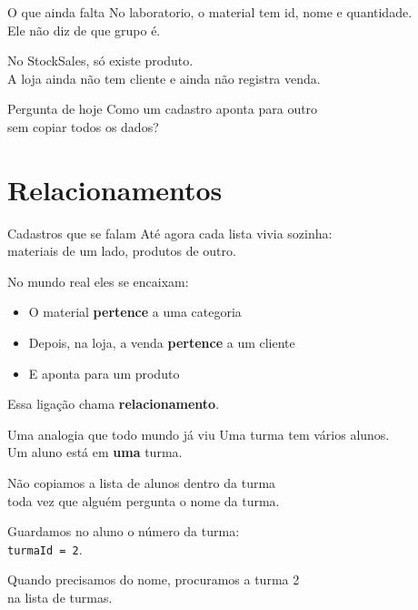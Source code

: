 \documentclass[aspectratio=169,11pt]{beamer}
\begin{document}
\begin{frame}{O que ainda falta}
  No laboratorio, o material tem id, nome e quantidade.\\
  Ele não diz de que grupo é.

  \vspace{0.5em}
  No StockSales, só existe produto.\\
  A loja ainda não tem cliente e ainda não registra venda.

  \vspace{0.6em}
  \begin{block}{Pergunta de hoje}
    Como um cadastro aponta para outro\\
    sem copiar todos os dados?
  \end{block}
\end{frame}

\section{Relacionamentos}

\begin{frame}{Cadastros que se falam}
  Até agora cada lista vivia sozinha:\\
  materiais de um lado, produtos de outro.

  \vspace{0.5em}
  No mundo real eles se encaixam:
  \begin{itemize}
    \item O material \textbf{pertence} a uma categoria
    \item Depois, na loja, a venda \textbf{pertence} a um cliente
    \item E aponta para um produto
  \end{itemize}

  \vspace{0.5em}
  Essa ligação chama \textbf{relacionamento}.
\end{frame}

\begin{frame}{Uma analogia que todo mundo já viu}
  Uma turma tem vários alunos.\\
  Um aluno está em \textbf{uma} turma.

  \vspace{0.5em}
  Não copiamos a lista de alunos dentro da turma\\
  toda vez que alguém pergunta o nome da turma.

  \vspace{0.5em}
  Guardamos no aluno o número da turma:\\
  \texttt{turmaId = 2}.

  \vspace{0.5em}
  Quando precisamos do nome, procuramos a turma 2\\
  na lista de turmas.
\end{frame}
\end{document}
